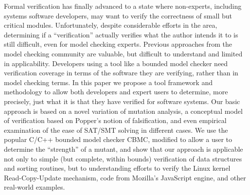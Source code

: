 Formal verification has finally advanced to a state where non-experts, including systems software developers, may want to verify the correctness of small but critical modules.  Unfortunately, despite considerable efforts in the area, determining if a ``verification'' actually verifies what the author intends it to is still difficult, even for model checking experts.  Previous approaches from the model checking community are valuable, but difficult to understand and limited in applicability.  Developers using a tool like a bounded model checker need verification coverage in terms of the software they are verifying, rather than in model checking terms.  In this paper we propose a tool framework and methodology to allow both developers and expert users to determine, more precisely, just what it is that they have verified for software systems.  Our basic approach is based on a novel variation of mutation analysis, a conceptual model of verification based on Popper's notion of falsification, and even empirical examination of the ease of SAT/SMT solving in different cases.  We use the popular C/C++ bounded model checker CBMC, modified to allow a user to determine the ``strength'' of a mutant, and show that our approach is applicable not only to simple (but complete, within bounds) verification of data structures and sorting routines, but to understanding efforts to verify the Linux kernel Read-Copy-Update mechanism, code from Mozilla's JavaScript engine, and other real-world examples.
